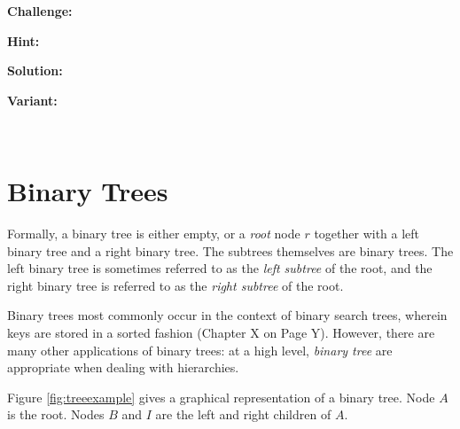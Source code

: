 \documentclass[11pt,a4paper]{article}
\begin{document}
\textbf{Challenge:} 

\textbf{Hint:} 

\textbf{Solution:} 

\textbf{Variant:} 

\ %

\section{Binary Trees}

Formally, a binary tree is either empty, or a \textit{root} node $r$ together
with a left binary tree and a right binary tree. The subtrees themselves are
binary trees. The left binary tree is sometimes referred to as the \textit{left
subtree} of the root, and the right binary tree is referred to as the
\textit{right subtree} of the root.

Binary trees most commonly occur in the context of binary search trees, wherein
keys are stored in a sorted fashion (Chapter X on Page Y). However, there are
many other applications of binary trees: at a high level, \textit{binary tree} are
appropriate when dealing with hierarchies. 

Figure \ref{fig:treeexample} gives a graphical representation of a binary tree.
Node $A$ is the root. Nodes $B$ and $I$ are the left and right children of $A$.
\end{document}
